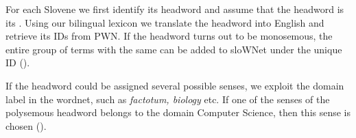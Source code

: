 \documentclass[output=paper]{LSP/langsci}
\begin{document}
For each Slovene   we first identify its headword and assume that the headword is its . Using our bilingual lexicon we translate the headword into English and retrieve its  IDs from PWN. If the headword turns out to be monosemous, the entire group of  terms with the same  can be added to sloWNet under the unique  ID ().


\begin{table}
\caption{Monosemous headword}
\label{tab:vintar:5}
\end{table}

If the headword could be assigned several possible senses, we exploit the domain label in the wordnet, such as \textit{factotum, biology} etc. If one of the senses of the polysemous headword belongs to the domain Computer Science, then this sense is chosen ().
\end{document}
